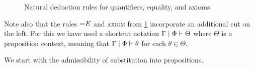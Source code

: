 \begin{figure}
  \centering
  \caption{Natural deduction rules for quantifiers, equality, and axioms}
  \label{fig:fol-natded}
\end{figure}

Note also that the rules $\mathord{=}E$ and \textsc{axiom} from \cref{fig:fol-natded} incorporate an additional cut on the left.
For this we have used a shortcut notation $\Gamma\mid \Phi\vdash \Theta$ where $\Theta$ is a proposition context, meaning that $\Gamma\mid \Phi\vdash \theta$ for each $\theta\in\Theta$.

We start with the admissibility of substitution into propositions.

